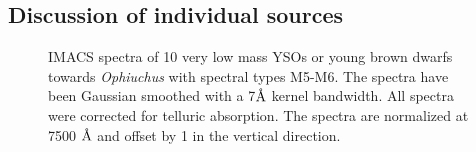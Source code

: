 \begin{landscape}
	
\end{landscape}

\subsection{Discussion of individual sources}
\label{sec_individual_sources}

\begin{figure}[ht!]
\caption[IMACS spectra of 10 very low mass YSOs or young brown dwarfs towards \emph{Ophiuchus} with spectral types M5-M6]{IMACS spectra of 10 very low mass YSOs or young brown dwarfs towards \emph{Ophiuchus} with spectral types M5-M6.  The spectra have been Gaussian smoothed with a 7$\mbox{\normalfont\AA}$ kernel bandwidth.  All spectra were corrected for telluric absorption.  The spectra are normalized at 7500 $\mbox{\normalfont\AA}$ and offset by 1 in the vertical direction. \label{fig_IMACS_spectra1} }
\centering

\end{figure}
